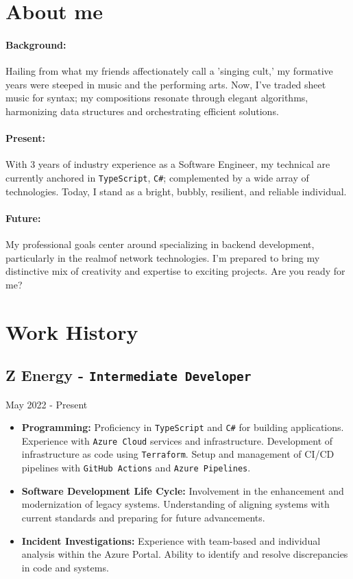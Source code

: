\documentclass[a4paper, 10pt]{article}
\newcommand{\code}[1]{\textcolor{code}{\texttt{#1}}}
\begin{document}
\begin{multicols*}{2}
	\section*{About me}
	\paragraph*{Background:}
	Hailing from what my friends affectionately call a 'singing cult,' my formative years were steeped in music and the performing arts. Now, I've traded sheet music for syntax; my compositions resonate through elegant algorithms, harmonizing data structures and orchestrating efficient solutions.
	\paragraph*{Present:}
	With 3 years of industry experience as a Software Engineer, my technical are currently anchored in \code{TypeScript}, \code{C\#}; complemented by a wide array of technologies. Today, I stand as a bright, bubbly, resilient, and reliable individual.
	\paragraph*{Future:}
	My professional goals center around specializing in backend development, particularly in the realmof network technologies. I'm prepared to bring my distinctive mix of creativity and expertise to exciting projects. Are you ready for me?

	\section*{Work History}
	\subsection*{Z Energy - \texttt{Intermediate Developer}}
	{\footnotesize{May 2022 - Present}}
	\begin{itemize}
		\item \textbf{Programming:}
		      \subitem Proficiency in \code{TypeScript} and \code{C\#} for building applications.
		      \subitem Experience with \code{Azure Cloud} services and infrastructure.
		      \subitem Development of infrastructure as code using \code{Terraform}.
		      \subitem Setup and management of CI/CD pipelines with \code{GitHub Actions} and \code{Azure Pipelines}.
		\item \textbf{Software Development Life Cycle:}
		      \subitem Involvement in the enhancement and modernization of legacy systems.
		      \subitem Understanding of aligning systems with current standards and preparing for future advancements.
		\item \textbf{Incident Investigations:}
		      \subitem Experience with team-based and individual analysis within the Azure Portal.
		      \subitem Ability to identify and resolve discrepancies in code and systems.
	\end{itemize}


\end{multicols*}
\end{document}
